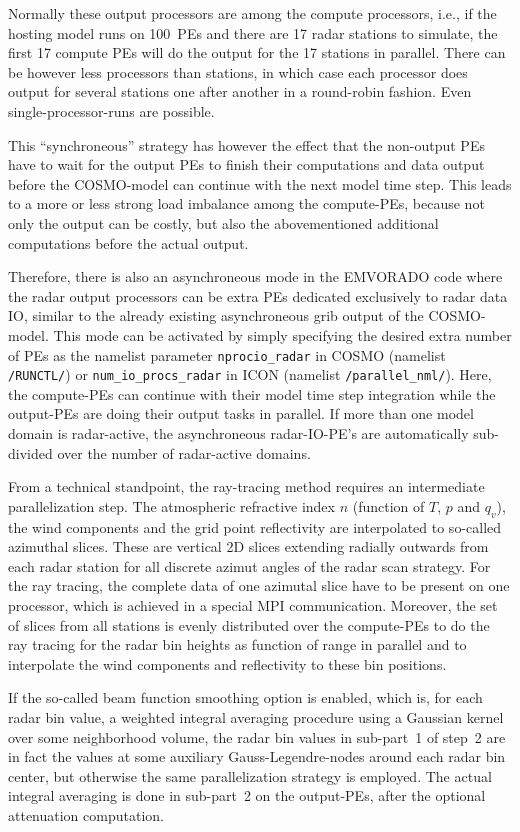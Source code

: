 \documentclass[10pt,a4paper,twoside,headinclude,footinclude,parskip=half]{scrartcl}
\newcommand{\srcform}[1]{\mbox{\texttt{#1}}\xspace}%
\begin{document}
Normally these output processors are among the compute processors, i.e., if the hosting model runs on 100~PEs and there are 17 radar stations to simulate,
the first 17 compute PEs will do the output for the 17 stations in parallel. There can be
however less processors than stations, in which case each processor does output for several stations one after another
in a round-robin fashion. Even single-processor-runs are possible.

This ``synchroneous'' strategy has however the effect that the non-output PEs have to
wait for the output PEs to finish their computations and data output before the COSMO-model
can continue with the next model time step. This leads to a more or less strong
load imbalance among the compute-PEs, because not only the output can be costly, but also the
abovementioned additional computations before the actual output.

Therefore, there is also an asynchroneous mode in the EMVORADO code where the radar output processors can
be extra PEs dedicated exclusively to radar data IO, similar to the already existing asynchroneous
grib output of the COSMO-model. This mode can be activated by simply specifying the desired extra number
of PEs as the namelist parameter \srcform{nprocio_radar} in COSMO (namelist \srcform{/RUNCTL/}) or \srcform{num_io_procs_radar} in ICON (namelist \srcform{/parallel_nml/}).
Here, the compute-PEs can continue with their model time step integration while
the output-PEs are doing their output tasks in parallel.
If more than one model domain is radar-active, the asynchroneous radar-IO-PE's are automatically sub-divided
over the number of radar-active domains.


From a technical standpoint, the ray-tracing method requires an intermediate parallelization step. The atmospheric
refractive index $n$ (function of $T$, $p$ and $q_v$), the wind components and the grid point reflectivity
are interpolated to so-called azimuthal slices. These are vertical 2D slices extending
radially outwards from each radar station for all discrete azimut angles of the radar scan strategy. For the ray tracing,
the complete data of one azimutal slice have to be present on one processor, which is achieved in a special MPI communication. Moreover,
the set of slices from all stations is evenly distributed over the compute-PEs to do the ray tracing for the radar bin heights as function of range in parallel and to interpolate the
wind components and reflectivity to these bin positions. 

If the so-called beam function smoothing option is enabled, which is, for each radar bin value, a weighted integral averaging procedure using
a Gaussian kernel over some neighborhood volume, the radar bin values in sub-part~1 of step~2 are in fact the values at
some auxiliary Gauss-Legendre-nodes around each radar bin center, but otherwise the same parallelization strategy is employed.
The actual integral averaging is done in sub-part~2 on the output-PEs, after the optional attenuation computation.
\end{document}
